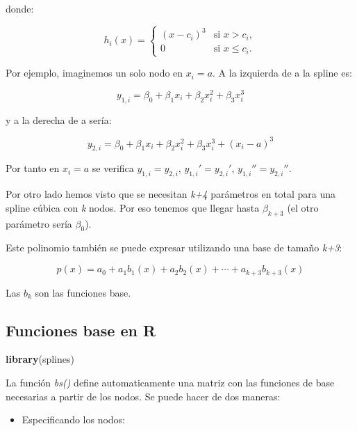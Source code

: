 \documentclass[
]{article}
\newenvironment{Shaded}{\begin{snugshade}}{\end{snugshade}}
\newcommand{\KeywordTok}[1]{\textcolor[rgb]{0.13,0.29,0.53}{\textbf{#1}}}
\newcommand{\NormalTok}[1]{#1}
\providecommand{\tightlist}{%
  \setlength{\itemsep}{0pt}\setlength{\parskip}{0pt}}
\begin{document}
donde:

\[
\begin{equation*}
h_i(x) = \left\{
\begin{array}{cl}
(x - c_i)^3 & \text{si } x > c_i,\\
0 & \text{si } x \leq c_i.
\end{array} \right.
\end{equation*}
\]

Por ejemplo, imaginemos un solo nodo en \(x_i = a\). A la izquierda de a
la spline es:

\[
y_{1,i} = \beta_0 + \beta_1 x_i + \beta_2 x_i^2 + \beta_3 x_i^3 
\]

y a la derecha de a sería:

\[
y_{2,i} = \beta_0 + \beta_1 x_i + \beta_2 x_i^2 + \beta_3 x_i^3 + (x_i - a)^3
\]

Por tanto en \(x_i = a\) se verifica \(y_{1,i} = y_{2,i}\),
\(y_{1,i}' = y_{2,i}'\), \(y_{1,i}'' = y_{2,i}''\).

Por otro lado hemos visto que se necesitan \emph{k+4} parámetros en
total para una spline cúbica con \emph{k} nodos. Por eso tenemos que
llegar hasta \(\beta_{k+3}\) (el otro parámetro sería \(\beta_0\)).

Este polinomio también se puede expresar utilizando una base de tamaño
\emph{k+3}:

\[
p(x) = a_0 + a_1 b_1(x) + a_2 b_2(x) + \cdots + a_{k+3} b_{k+3}(x)
\]

Las \(b_k\) son las funciones base.

\hypertarget{funciones-base-en-r}{%
\subsection{Funciones base en R}\label{funciones-base-en-r}}

\begin{Shaded}
\begin{Highlighting}[]
\KeywordTok{library}\NormalTok{(splines)}
\end{Highlighting}
\end{Shaded}

La función \emph{bs()} define automaticamente una matriz con las
funciones de base necesarias a partir de los nodos. Se puede hacer de
dos maneras:

\begin{itemize}
\tightlist
\item
  Especificando los nodos:
\end{itemize}
\end{document}
